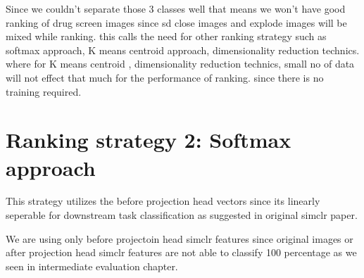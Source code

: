Since we couldn't separate those 3 classes well that means we won't have good ranking of drug screen images since sd close images and explode images will be mixed while ranking. this calls the need for other ranking strategy such as softmax approach, K means centroid approach, dimensionality reduction technics. where for K means centroid , dimensionality reduction technics, small no of data will not effect that much for the performance of ranking. since there is no training required.

\section{Ranking strategy 2: Softmax approach}

This strategy utilizes the before projection head vectors since its linearly seperable for downstream task classification as suggested in original simclr paper.

We are using only before projectoin head simclr features since original images or after projection head simclr features are not able to classify 100 percentage as we seen in intermediate evaluation chapter.

